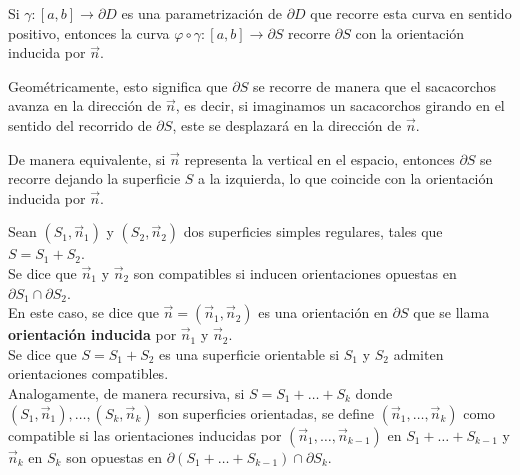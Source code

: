 \begin{observación}
Si \( \gamma : [a,b] \to \partial D \) es una parametrización de \( \partial D \) que recorre esta curva en sentido positivo, entonces la curva \( \varphi \circ \gamma : [a,b] \to \partial S \) recorre \( \partial S \) con la orientación inducida por \( \vec{n} \).

Geométricamente, esto significa que \( \partial S \) se recorre de manera que
el sacacorchos avanza en la dirección de \( \vec{n} \), es decir, si imaginamos
un sacacorchos girando en el sentido del recorrido de \( \partial S \), este se
desplazará en la dirección de \( \vec{n} \).

De manera equivalente, si \( \vec{n} \) representa la vertical en el espacio,
entonces \( \partial S \) se recorre dejando la superficie \( S \) a la
izquierda, lo que coincide con la orientación inducida por \( \vec{n} \).
\end{observación}

\begin{definición}
    Sean $(S_1, \vec{n}_1)$ y $(S_2, \vec{n}_2)$ dos superficies simples regulares, tales que $S=S_1 + S_2$.\\
    Se dice que $\vec{n}_1$ y $\vec{n}_2$ son compatibles si inducen orientaciones opuestas en $\partial S_1 \cap \partial S_2$.\\
    En este caso, se dice que $\vec{n} = (\vec{n}_1, \vec{n}_2)$ es una orientación en $\partial S$ que se llama \textbf{orientación inducida} por $\vec{n}_1$ y $\vec{n}_2$.\\
    Se dice que $S=S_1 + S_2$ es una superficie orientable si $S_1$ y $S_2$ admiten orientaciones compatibles.\\
    Analogamente, de manera recursiva, si $S = S_1 + \ldots + S_k$ donde $(S_1, \vec{n}_1), \ldots, (S_k, \vec{n}_k)$ son superficies orientadas, se define $(\vec{n}_1, \ldots, \vec{n}_k)$ como compatible si las orientaciones inducidas por $(\vec{n}_1, \ldots, \vec{n}_{k-1})$ en $S_1 + \ldots + S_{k-1}$ y $\vec{n}_k$ en $S_k$ son opuestas en $\partial (S_1 + \ldots + S_{k-1}) \cap \partial S_k$.
\end{definición}

